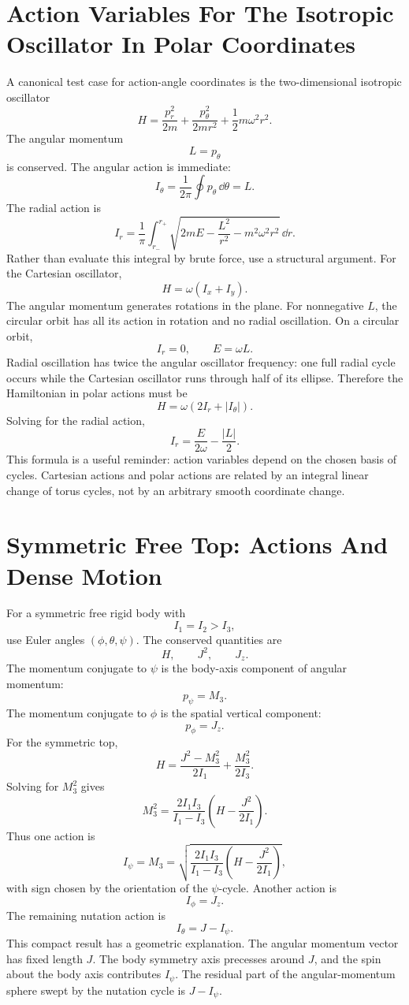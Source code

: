 \section[Oscillator Actions In Polar Coordinates]{Action Variables For The
Isotropic Oscillator In Polar Coordinates}
\label{sec:detailed-oscillator-actions}

A canonical test case for action-angle coordinates is the two-dimensional
isotropic oscillator
\[
  H=
  \frac{p_r^2}{2m}
  +
  \frac{p_\theta^2}{2mr^2}
  +
  \frac12m\omega^2r^2.
\]
The angular momentum
\[
  L=p_\theta
\]
is conserved. The angular action is immediate:
\[
  I_\theta=\frac1{2\pi}\oint p_\theta\,\dd\theta=L.
\]
The radial action is
\[
  I_r
  =
  \frac1{\pi}
  \int_{r_-}^{r_+}
  \sqrt{
    2mE-\frac{L^2}{r^2}-m^2\omega^2r^2
  }\,\dd r.
\]
Rather than evaluate this integral by brute force, use a structural argument.
For the Cartesian oscillator,
\[
  H=\omega(I_x+I_y).
\]
The angular momentum generates rotations in the plane. For nonnegative \(L\),
the circular orbit has all its action in rotation and no radial oscillation.
On a circular orbit,
\[
  I_r=0,
  \qquad
  E=\omega L.
\]
Radial oscillation has twice the angular oscillator frequency: one full radial
cycle occurs while the Cartesian oscillator runs through half of its ellipse.
Therefore the Hamiltonian in polar actions must be
\[
  \boxed{
  H=\omega(2I_r+|I_\theta|).
  }
\]
Solving for the radial action,
\[
  \boxed{
  I_r=\frac{E}{2\omega}-\frac{|L|}{2}.
  }
\]
This formula is a useful reminder: action variables depend on the chosen basis
of cycles. Cartesian actions and polar actions are related by an integral
linear change of torus cycles, not by an arbitrary smooth coordinate change.

\section{Symmetric Free Top: Actions And Dense Motion}
\label{sec:detailed-symmetric-top-actions}

For a symmetric free rigid body with
\[
  I_1=I_2>I_3,
\]
use Euler angles \((\phi,\theta,\psi)\). The conserved quantities are
\[
  H,\qquad J^2,\qquad J_z.
\]
The momentum conjugate to \(\psi\) is the body-axis component of angular
momentum:
\[
  p_\psi=M_3.
\]
The momentum conjugate to \(\phi\) is the spatial vertical component:
\[
  p_\phi=J_z.
\]
For the symmetric top,
\[
  H
  =
  \frac{J^2-M_3^2}{2I_1}
  +
  \frac{M_3^2}{2I_3}.
\]
Solving for \(M_3^2\) gives
\[
  M_3^2
  =
  \frac{2I_1I_3}{I_1-I_3}
  \left(
    H-\frac{J^2}{2I_1}
  \right).
\]
Thus one action is
\[
  I_\psi=M_3
  =
  \sqrt{
  \frac{2I_1I_3}{I_1-I_3}
  \left(
    H-\frac{J^2}{2I_1}
  \right)
  },
\]
with sign chosen by the orientation of the \(\psi\)-cycle. Another action is
\[
  I_\phi=J_z.
\]
The remaining nutation action is
\[
  \boxed{
  I_\theta=J-I_\psi.
  }
\]
This compact result has a geometric explanation. The angular momentum vector
has fixed length \(J\). The body symmetry axis precesses around \(J\), and the
spin about the body axis contributes \(I_\psi\). The residual part of the
angular-momentum sphere swept by the nutation cycle is \(J-I_\psi\).

